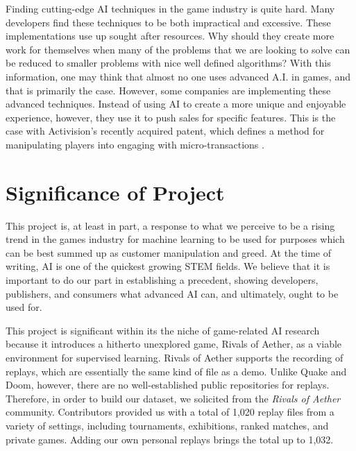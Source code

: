 Finding cutting-edge AI techniques in the game industry is quite hard. Many developers find these techniques to be both impractical and excessive. These implementations use up sought after resources. Why should they create more work for themselves when many of the problems that we are looking to solve can be reduced to smaller problems with nice well defined algorithms? With this information, one may think that almost no one uses advanced A.I. in games, and that is primarily the case. However, some companies are implementing these advanced techniques. Instead of using AI to create a more unique and enjoyable experience, however, they use it to push sales for specific features. This is the case with Activision's recently acquired patent, which defines a method for manipulating players into engaging with micro-transactions \cite{Marr:2017}.



\section{Significance of Project}

This project is, at least in part, a response to what we perceive to be a rising trend in the games industry for machine learning to be used for purposes which can be best summed up as customer manipulation and greed. At the time of writing, AI is one of the quickest growing STEM fields. We believe that it is important to do our part in establishing a precedent, showing developers, publishers, and consumers what advanced AI can, and ultimately, ought to be used for.

This project is significant within its the niche of game-related AI research because it introduces a hitherto unexplored game, Rivals of Aether, as a viable environment for supervised learning. Rivals of Aether supports the recording of replays, which are essentially the same kind of file as a demo. Unlike Quake and Doom, however, there are no well-established public repositories for replays. Therefore, in order to build our dataset, we solicited from the {\it Rivals of Aether} community. Contributors provided us with a total of 1,020 replay files from a variety of settings, including tournaments, exhibitions, ranked matches, and private games. Adding our own personal replays brings the total up to 1,032.

